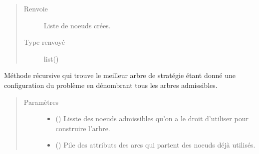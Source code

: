 \documentclass[letterpaper,10pt,french]{sphinxmanual}
\begin{document}
\begin{fulllineitems}
\begin{fulllineitems}
\begin{quote}
\begin{description}
\begin{itemize}
\end{itemize}

\item[{Renvoie}] \leavevmode
{} \textendash{} Liste de noeuds crées.

\item[{Type renvoyé}] \leavevmode
list({\hyperref[\detokenize{index:StrategyTree.NodeST}]{}})

\end{description}\end{quote}

\end{fulllineitems}


\begin{fulllineitems}
\label{\detokenize{index:DecisionTheoreticTroubleshooting.TroubleShootingProblem._evaluate_all_st}}
Méthode récursive qui trouve le meilleur arbre de stratégie étant donné
une configuration du problème en dénombrant tous les arbres
admissibles.
\begin{quote}\begin{description}
\item[{Paramètres}] \leavevmode\begin{itemize}
\item {} 
 (\sphinxstyleliteralemphasis{\sphinxupquote{)}}) \textendash{} Lisste des noeuds admissibles qu’on a le droit d’utiliser pour
construire l’arbre.

\item {} 
 (\sphinxstyleliteralemphasis{\sphinxupquote{(}}\sphinxstyleliteralemphasis{\sphinxupquote{(}}\sphinxstyleliteralemphasis{\sphinxupquote{)}}\sphinxstyleliteralemphasis{\sphinxupquote{)}}\sphinxstyleliteralemphasis{\sphinxupquote{, }}) \textendash{} Pile des attributs des arcs qui partent des noeuds déjà utilisés.


\end{itemize}
\end{description}
\end{quote}
\end{fulllineitems}
\end{fulllineitems}
\end{document}
